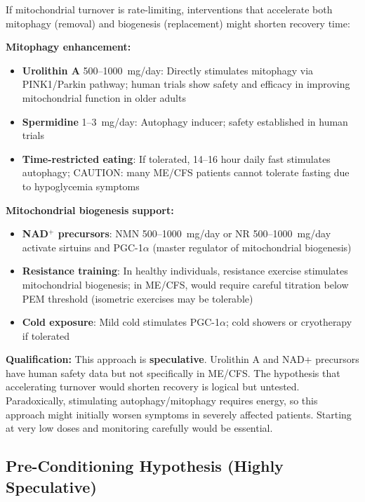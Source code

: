 \begin{speculation}
If mitochondrial turnover is rate-limiting, interventions that accelerate both mitophagy (removal) and biogenesis (replacement) might shorten recovery time:

\textbf{Mitophagy enhancement:}
\begin{itemize}
    \item \textbf{Urolithin A} 500--1000~mg/day: Directly stimulates mitophagy via PINK1/Parkin pathway; human trials show safety and efficacy in improving mitochondrial function in older adults
    \item \textbf{Spermidine} 1--3~mg/day: Autophagy inducer; safety established in human trials
    \item \textbf{Time-restricted eating}: If tolerated, 14--16 hour daily fast stimulates autophagy; CAUTION: many ME/CFS patients cannot tolerate fasting due to hypoglycemia symptoms
\end{itemize}

\textbf{Mitochondrial biogenesis support:}
\begin{itemize}
    \item \textbf{NAD$^+$ precursors}: NMN 500--1000~mg/day or NR 500--1000~mg/day activate sirtuins and PGC-1$\alpha$ (master regulator of mitochondrial biogenesis)
    \item \textbf{Resistance training}: In healthy individuals, resistance exercise stimulates mitochondrial biogenesis; in ME/CFS, would require careful titration below PEM threshold (isometric exercises may be tolerable)
    \item \textbf{Cold exposure}: Mild cold stimulates PGC-1$\alpha$; cold showers or cryotherapy if tolerated
\end{itemize}

\textbf{Qualification:} This approach is \textbf{speculative}. Urolithin A and NAD+ precursors have human safety data but not specifically in ME/CFS. The hypothesis that accelerating turnover would shorten recovery is logical but untested. Paradoxically, stimulating autophagy/mitophagy requires energy, so this approach might initially worsen symptoms in severely affected patients. Starting at very low doses and monitoring carefully would be essential.
\end{speculation}

\subsection{Pre-Conditioning Hypothesis (Highly Speculative)}
\label{subsec:preconditioning}


